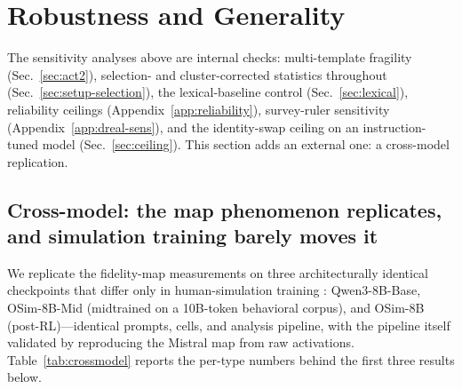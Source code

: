 \section{Robustness and Generality}
\label{sec:robustness}
The sensitivity analyses above are internal checks: multi-template
fragility (Sec.~\ref{sec:act2}), selection- and cluster-corrected
statistics throughout (Sec.~\ref{sec:setup-selection}), the
lexical-baseline control (Sec.~\ref{sec:lexical}), reliability ceilings
(Appendix~\ref{app:reliability}), survey-ruler sensitivity
(Appendix~\ref{app:dreal-sens}), and the identity-swap ceiling on an
instruction-tuned model (Sec.~\ref{sec:ceiling}). This section adds an
external one: a cross-model replication.

\subsection{Cross-model: the map phenomenon replicates, and simulation training barely moves it}
\label{sec:crossmodel}
We replicate the fidelity-map measurements on three architecturally
identical checkpoints that differ only in human-simulation training
\citep{odyssim2026}: Qwen3-8B-Base, OSim-8B-Mid (midtrained on a
10B-token behavioral corpus), and OSim-8B (post-RL)---identical prompts,
cells, and analysis pipeline, with the pipeline itself validated by
reproducing the Mistral map from raw activations. Table~\ref{tab:crossmodel}
reports the per-type numbers behind the first three results below.

